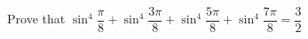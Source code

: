 
%
%
%
%
% 
% 
\question[4] Prove that $\sin^4\dfrac{\pi}{8} + \sin^4\dfrac{3\pi}{8} + \sin^4\dfrac{5\pi}{8} + \sin^4\dfrac{7\pi}{8} = \dfrac{3}{2}$


\ifprintanswers
\fi 

